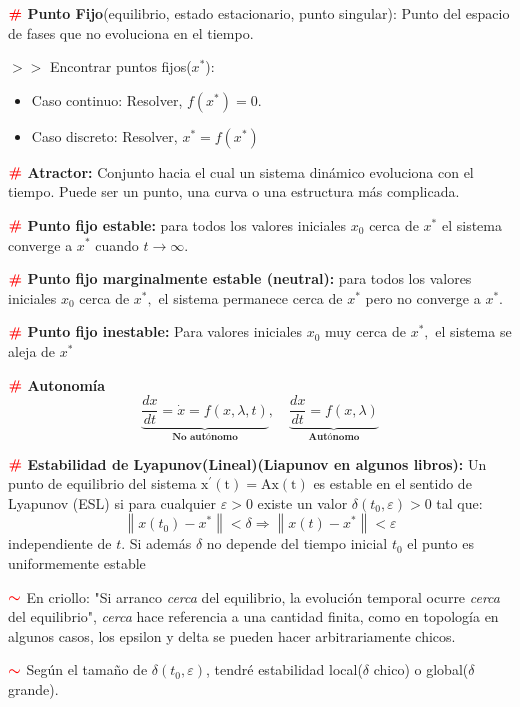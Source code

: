 \documentclass[%
 reprint,
 amsmath,amssymb,
 aps,
]{revtex4-1}
\newcommand{\definir}{\color{red}{\textbf{\#}}}
\newcommand{\nota}{\textcolor{red}{\color{red}{\boldsymbol{\sim}}}}
\begin{document}
$\definir$ \textbf{Punto Fijo}(equilibrio, estado estacionario, punto singular): 
Punto del espacio de fases que no evoluciona en el tiempo.

$>>$ Encontrar puntos fijos($x^*$):
\begin{itemize}
  \item Caso continuo: Resolver, $f(x^*) = 0$.
  \item Caso discreto: Resolver, $x^* = f(x^*)$
\end{itemize}

$\definir$ \textbf{Atractor:} 
Conjunto hacia el cual un sistema dinámico evoluciona con el tiempo. Puede ser un punto, una curva o una estructura más complicada.

$\definir$ \textbf{Punto fijo estable:} 
para todos los valores iniciales $x_0$ cerca de $x^{*}$ el sistema converge a $x^{*}$ cuando $t \rightarrow \infty .$

$\definir$ \textbf{Punto fijo marginalmente estable (neutral):} 
para todos los valores iniciales $x_0$ cerca de $x^{*},$ el sistema permanece cerca de $x^{*}$ pero no converge a $x^{*}$.

$\definir$ \textbf{Punto fijo inestable:}
Para valores iniciales $x_0$ muy cerca de $x^{*},$ el sistema se aleja de $x^{*}$

$\definir$ \textbf{Autonomía}
$$
\underbrace{\frac{d x}{d t}=\dot{x}=f(x, \lambda, t) }_{\textbf{No autónomo}}
,\quad 
\underbrace{\frac{d x}{d t}=f(x, \lambda)}_{\textbf{Autónomo}}
$$

$\definir$ \textbf{Estabilidad de Lyapunov(Lineal)(Liapunov en algunos libros):} 
Un punto de equilibrio del sistema $\mathrm{x}^{\prime}(\mathrm{t})=\mathrm{Ax}(\mathrm{t})$ es estable en el sentido de Lyapunov (ESL) si para cualquier $\varepsilon>0$ existe un valor $\delta\left(t_{0}, \varepsilon\right)>0$ tal que:
$$
\left\|x\left(t_{0}\right)-x^{*}\right\|<\delta \Rightarrow\left\|x(t)-x^{*}\right\|<\varepsilon
$$
independiente de $t$. Si además $\delta$ no depende del tiempo inicial $t_{0}$ el punto es uniformemente estable

$\nota$ 
En criollo: "Si arranco \textit{cerca} del equilibrio, la evolución temporal ocurre \textit{cerca} del equilibrio", \textit{cerca} hace referencia a una cantidad finita, como en topología en algunos casos, los epsilon y delta se pueden hacer arbitrariamente chicos.

$\nota$ 
Según el tamaño de $\delta(t_0, \varepsilon)$, tendré estabilidad local($\delta$ chico) o global($\delta$ grande).
\end{document}
